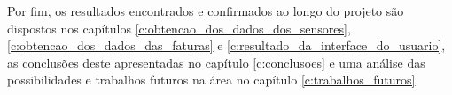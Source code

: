 Por fim, os resultados encontrados e confirmados ao longo do projeto são dispostos nos capítulos \ref{c:obtencao_dos_dados_dos_sensores}, \ref{c:obtencao_dos_dados_das_faturas} e \ref{c:resultado_da_interface_do_usuario}, as conclusões deste apresentadas no capítulo \ref{c:conclusoes} e uma análise das possibilidades e trabalhos futuros na área no capítulo \ref{c:trabalhos_futuros}.

